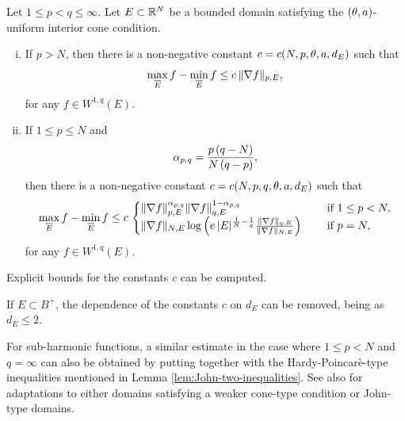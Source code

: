 \documentclass[a4paper,10pt]{amsart}
\numberwithin{equation}{section}
\begin{document}


\begin{lem}
	\label{lem:p>N + p<N and p=N} 
	Let $1 \le p < q\le \infty$.
	Let $E \subset \mathbb{R}^N$ be a bounded domain satisfying the $(\theta, a)$-uniform interior cone condition. 
	
	\begin{enumerate}[(i)]
	\item If $p>N$, then there is a non-negative constant $c=c (N, p, \theta, a , d_E)$ such that
	\begin{equation*}
	\max\limits_{\overline{ E}} f - \min\limits_{ \overline{ E}} f \le c \, \Vert \nabla f \Vert_{p, E} ,
	\end{equation*}
	for any $f\in W^{1,q}(E)$.
	
	\item If $1\le p\le N $ and
$$
\alpha_{p,q}=\frac{p\, (q-N)}{N\,(q-p)},
$$
then there is a non-negative constant $ c = c (N, p, q, \theta, a, d_E)$ such that
	\begin{equation*}
		\max\limits_{\overline{ E}} f - \min\limits_{ \overline{ E}} f \le 
		c \,
		\begin{cases}
		\Vert\nabla f\Vert_{p, E}^{\alpha_{p,q}}\Vert\nabla f\Vert_{q,E}^{1-\alpha_{p,q}} \quad & \text{ if } 1 \le p<N,
		\\
		\Vert \nabla f \Vert_{N, E } \log\left( e \, |E|^{\frac{1}{N} - \frac{1}{q}} \frac{  \Vert \nabla f \Vert_{q, E} }{\Vert \nabla f \Vert_{N, E} }\right) \quad & \text{ if } p=N ,
		\end{cases}
	\end{equation*}
for any $f\in W^{1,q}(E)$.	
\end{enumerate}
\medskip
Explicit bounds for the constants $c$ can be computed.  

If $E \subset B^+$, the dependence of the constants $c$ on $d_E$ can be removed, being as $d_E \le 2$.
\end{lem}


\begin{rem}\label{rem:0 sub-harmonic version}
{\rm
For sub-harmonic functions, a similar estimate in the case where $1 \le p <N$ and $q=\infty$ can also be obtained by putting together \cite[Lemma 3.14]{Pog2} with the Hardy-Poincar\`e-type inequalities mentioned in Lemma \ref{lem:John-two-inequalities}. See also \cite[Theorems 3.1 and 3.2]{MP4} for adaptations to either domains satisfying a weaker cone-type condition or John-type domains. 
}
\end{rem}
\end{document}
